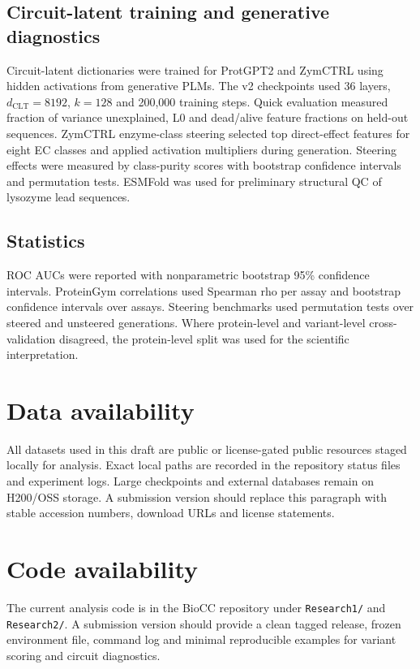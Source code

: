 \documentclass[pdflatex,sn-nature]{sn-jnl}
\begin{document}
\subsection{Circuit-latent training and generative diagnostics}

Circuit-latent dictionaries were trained for ProtGPT2 and ZymCTRL using hidden activations from generative PLMs. The v2 checkpoints used 36 layers, $d_\mathrm{CLT}=8192$, $k=128$ and 200,000 training steps. Quick evaluation measured fraction of variance unexplained, L0 and dead/alive feature fractions on held-out sequences. ZymCTRL enzyme-class steering selected top direct-effect features for eight EC classes and applied activation multipliers during generation. Steering effects were measured by class-purity scores with bootstrap confidence intervals and permutation tests. ESMFold was used for preliminary structural QC of lysozyme lead sequences.

\subsection{Statistics}

ROC AUCs were reported with nonparametric bootstrap 95\% confidence intervals. ProteinGym correlations used Spearman rho per assay and bootstrap confidence intervals over assays. Steering benchmarks used permutation tests over steered and unsteered generations. Where protein-level and variant-level cross-validation disagreed, the protein-level split was used for the scientific interpretation.

\section*{Data availability}

All datasets used in this draft are public or license-gated public resources staged locally for analysis. Exact local paths are recorded in the repository status files and experiment logs. Large checkpoints and external databases remain on H200/OSS storage. A submission version should replace this paragraph with stable accession numbers, download URLs and license statements.

\section*{Code availability}

The current analysis code is in the BioCC repository under \texttt{Research1/} and \texttt{Research2/}. A submission version should provide a clean tagged release, frozen environment file, command log and minimal reproducible examples for variant scoring and circuit diagnostics.
\end{document}

